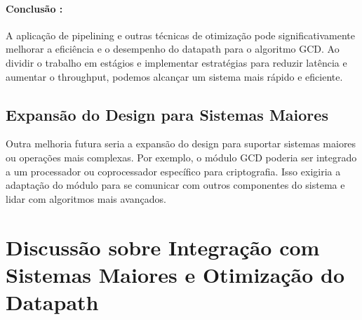 \documentclass[a4paper,11pt]{article} %
\begin{document}




\paragraph{Conclusão :}
A aplicação de pipelining e outras técnicas de otimização pode significativamente melhorar a eficiência e o desempenho do datapath para o algoritmo GCD. Ao dividir o trabalho em estágios e implementar estratégias para reduzir latência e aumentar o throughput, podemos alcançar um sistema mais rápido e eficiente.


\subsection{Expansão do Design para Sistemas Maiores}

Outra melhoria futura seria a expansão do design para suportar sistemas maiores ou operações mais complexas. Por exemplo, o módulo GCD poderia ser integrado a um processador ou coprocessador específico para criptografia. Isso exigiria a adaptação do módulo para se comunicar com outros componentes do sistema e lidar com algoritmos mais avançados.




\section{Discussão sobre Integração com Sistemas Maiores e Otimização do Datapath}
\end{document}
